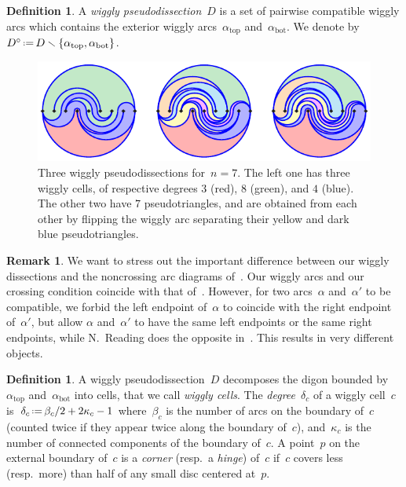 \documentclass{amsart}
\theoremstyle{definition}
\newtheorem{definition}[theorem]{Definition}
\newtheorem{remark}[theorem]{Remark}
\newcommand{\ssm}{\smallsetminus} %
\newcommand{\eqdef}{\mbox{\,\raisebox{0.2ex}{\scriptsize\ensuremath{\mathrm:}}\ensuremath{=}\,}} %
\newcommand{\darkblue}{\color{darkblue}} %
\newcommand{\defn}[1]{\textsl{\darkblue #1}} %
\newcommand{\vincent}[1]{\todo[color=blue!30]{\rm #1 \\ \hfill --- V.}}
\begin{document}
\begin{definition}
A \defn{wiggly pseudodissection}~$D$ is a set of pairwise compatible wiggly arcs which contains the exterior wiggly arcs~$\alpha_\mathrm{top}$ and~$\alpha_\mathrm{bot}$. We denote by~$D^\circ \eqdef D \ssm \{\alpha_\mathrm{top}, \alpha_\mathrm{bot}\}$.
%
\begin{figure}
\centerline{\includegraphics[scale=1.5]{wigglyPseudodissections}}
\caption{Three wiggly pseudodissections for~$n = 7$. The left one has three wiggly cells, of respective degrees $3$ (red), $8$ (green), and $4$ (blue). The other two have $7$ pseudotriangles, and are obtained from each other by flipping the wiggly arc separating their yellow and dark blue pseudotriangles.}
\label{fig:pseudodissections}
\end{figure}
\end{definition}

\begin{remark}
We want to stress out the important difference between our wiggly dissections and the noncrossing arc diagrams of~\cite{Reading-arcDiagrams}.
Our wiggly arcs and our crossing condition coincide with that of~\cite{Reading-arcDiagrams}.
However, for two arcs~$\alpha$ and~$\alpha'$ to be compatible, we forbid the left endpoint of~$\alpha$ to coincide with the right endpoint of~$\alpha'$, but allow $\alpha$ and~$\alpha'$ to have the same left endpoints or the same right endpoints, while N.~Reading does the opposite in~\cite{Reading-arcDiagrams}.
This results in very different objects.
\end{remark}


\begin{definition}
A wiggly pseudodissection~$D$ decomposes the digon bounded by~$\alpha_\mathrm{top}$ and~$\alpha_\mathrm{bot}$ into cells, that we call \defn{wiggly cells}.
The \defn{degree}~$\delta_c$ of a wiggly cell~$c$ is~$\delta_c \eqdef \beta_c/2+2\kappa_c-1$ where~$\beta_c$ is the number of arcs on the boundary of~$c$ (counted twice if they appear twice along the boundary of~$c$), and~$\kappa_c$ is the number of connected components of the boundary of~$c$.
A point~$p$ on the external boundary of~$c$ is a \defn{corner} (resp.~a \defn{hinge}) of~$c$ if~$c$ covers less (resp.~more) than half of any small disc centered at~$p$.
\end{definition}
\end{document}
